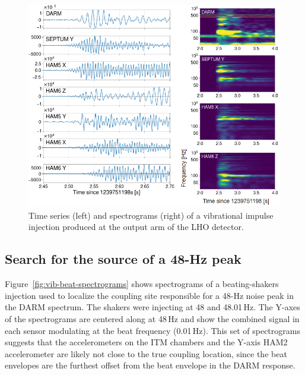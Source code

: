 \begin{figure}[t]
	\centering
	\includegraphics[width=\textwidth]{figures/noise-studies/vib-impulse.png}
	\caption{
		Time series (left) and spectrograms (right) of a vibrational impulse injection produced at the output arm of the LHO detector.}
	\label{fig:vib-impulse}
\end{figure}



\subsection{Search for the source of a 48-Hz peak}\label{sec:vib-48hz}

Figure~\ref{fig:vib-beat-spectrograms} shows spectrograms of a beating-shakers injection used to localize the coupling site responsible for a 48\hyp Hz noise peak in the \ac{DARM} spectrum.
The shakers were injecting at 48 and 48.01\,Hz. The Y-axes of the spectrograms are centered along at 48\,Hz and show the combined signal in each sensor modulating at the beat frequency (0.01\,Hz).
This set of spectrograms suggests that the accelerometers on the \ac{ITM} chambers and the Y-axis HAM2 accelerometer are likely not close to the true coupling location, since the beat envelopes are the furthest offset from the beat envelope in the \ac{DARM} response.

